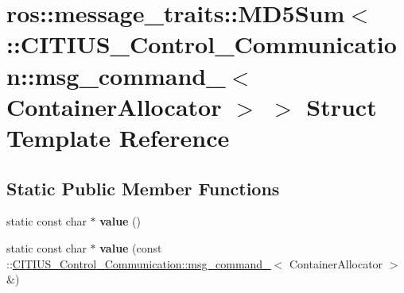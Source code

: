 \hypertarget{structros_1_1message__traits_1_1_m_d5_sum_3_01_1_1_c_i_t_i_u_s___control___communication_1_1msg_16c0523d0149fa8d0f3715a43a49bc93}{\section{ros\-:\-:message\-\_\-traits\-:\-:\-M\-D5\-Sum$<$ \-:\-:\-C\-I\-T\-I\-U\-S\-\_\-\-Control\-\_\-\-Communication\-:\-:msg\-\_\-command\-\_\-$<$ \-Container\-Allocator $>$ $>$ \-Struct \-Template \-Reference}
\label{structros_1_1message__traits_1_1_m_d5_sum_3_01_1_1_c_i_t_i_u_s___control___communication_1_1msg_16c0523d0149fa8d0f3715a43a49bc93}
}
\subsection*{\-Static \-Public \-Member \-Functions}
\begin{DoxyCompactItemize}
\item 
\hypertarget{structros_1_1message__traits_1_1_m_d5_sum_3_01_1_1_c_i_t_i_u_s___control___communication_1_1msg_16c0523d0149fa8d0f3715a43a49bc93_ac875af2abe0144d82913856d41909a27}{static const char $\ast$ {\bfseries value} ()}\label{structros_1_1message__traits_1_1_m_d5_sum_3_01_1_1_c_i_t_i_u_s___control___communication_1_1msg_16c0523d0149fa8d0f3715a43a49bc93_ac875af2abe0144d82913856d41909a27}

\item 
\hypertarget{structros_1_1message__traits_1_1_m_d5_sum_3_01_1_1_c_i_t_i_u_s___control___communication_1_1msg_16c0523d0149fa8d0f3715a43a49bc93_a4bb4e21b12c9f6c6137ab18fcc273d86}{static const char $\ast$ {\bfseries value} (const \-::\hyperlink{struct_c_i_t_i_u_s___control___communication_1_1msg__command__}{\-C\-I\-T\-I\-U\-S\-\_\-\-Control\-\_\-\-Communication\-::msg\-\_\-command\-\_\-}$<$ \-Container\-Allocator $>$ \&)}\label{structros_1_1message__traits_1_1_m_d5_sum_3_01_1_1_c_i_t_i_u_s___control___communication_1_1msg_16c0523d0149fa8d0f3715a43a49bc93_a4bb4e21b12c9f6c6137ab18fcc273d86}

\end{DoxyCompactItemize}
